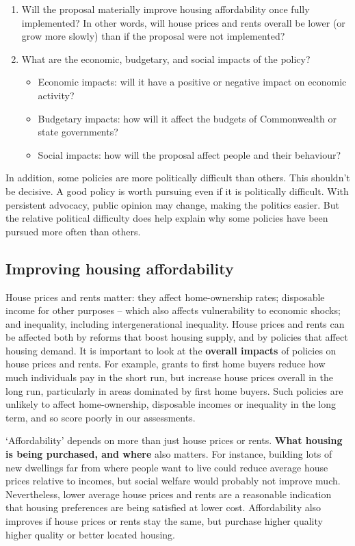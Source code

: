 \begin{enumerate}
\item
  Will the proposal materially improve housing affordability once fully implemented? In other words, will house prices and rents overall be lower (or grow more slowly) than if the proposal were not implemented?
\item
  What are the economic, budgetary, and social impacts of the policy?

  \begin{itemize}
  \item
    Economic impacts: will it have a positive or negative impact on economic activity?
  \item
    Budgetary impacts: how will it affect the budgets of Commonwealth or state governments?
  \item
    Social impacts: how will the proposal affect people and their behaviour?
  \end{itemize}
\end{enumerate}

In addition, some policies are more politically difficult than others.
This shouldn't be decisive.
A good policy is worth pursuing even if it is politically difficult.
With persistent advocacy, public opinion may change, making the politics easier.
But the relative political difficulty does help explain why some policies have been pursued more often than others.

\subsection{Improving housing affordability}\label{subsec:improving-housing-affordability}

House prices and rents matter: they affect home-ownership rates; disposable income for other purposes -- which also affects vulnerability to economic shocks; and inequality, including intergenerational inequality.
House prices and rents can be affected both by reforms that boost housing supply, and by policies that affect housing demand. It is important to look at the \textbf{overall impacts} of policies on house prices and rents.
For example, grants to first home buyers reduce how much individuals pay in the short run, but increase house prices overall in the long run, particularly in areas dominated by first home buyers.
Such policies are unlikely to affect home-ownership, disposable incomes or inequality in the long term, and so score poorly in our assessments.

`Affordability' depends on more than just house prices or rents.
\textbf{What housing is being purchased, and where} also matters.
For instance, building lots of new dwellings far from where people want to live could reduce average house prices relative to incomes, but social welfare would probably not improve much. 
Nevertheless, lower average house prices and rents are a reasonable indication that housing preferences are being satisfied at lower cost.
Affordability also improves if house prices or rents stay the same, but purchase higher quality higher quality or better located housing.


